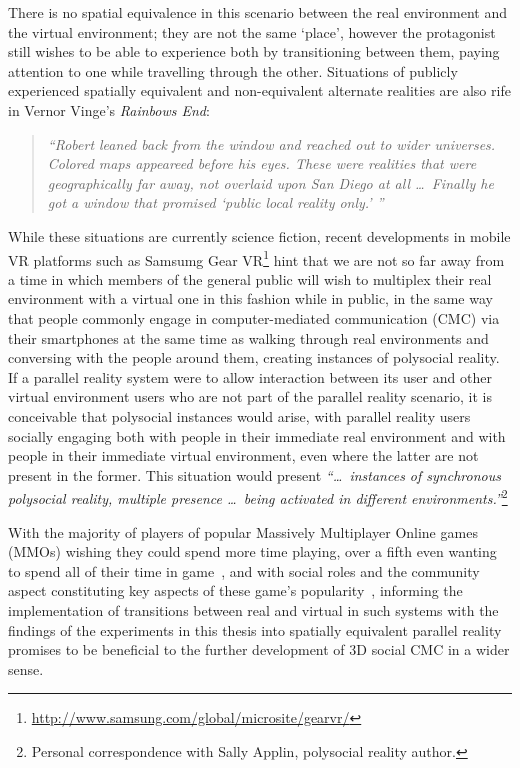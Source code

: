 There is no spatial equivalence in this scenario between the real environment and the virtual environment; they are not the same `place', however the protagonist still wishes to be able to experience both by transitioning between them, paying attention to one while travelling through the other. Situations of publicly experienced spatially equivalent and non-equivalent alternate realities are also rife in Vernor Vinge's \textit{Rainbows End}:

\begin{quote}
	\textit{``Robert leaned back from the window and reached out to wider universes. Colored maps appeareed before his eyes. These were realities that were geographically far away, not overlaid upon San Diego at all \ldots\ Finally he got a window that promised `public local reality only.' ''}~\cite{Vinge2006}
\end{quote}

While these situations are currently science fiction, recent developments in mobile VR platforms such as Samsumg Gear VR\footnote{\url{http://www.samsung.com/global/microsite/gearvr/}} hint that we are not so far away from a time in which members of the general public will wish to multiplex their real environment with a virtual one in this fashion while in public, in the same way that people commonly engage in computer-mediated communication (CMC) via their smartphones at the same time as walking through real environments and conversing with the people around them, creating instances of polysocial reality. If a parallel reality system were to allow interaction between its user and other virtual environment users who are not part of the parallel reality scenario, it is conceivable that polysocial instances would arise, with parallel reality users socially engaging both with people in their immediate real environment and with people in their immediate virtual environment, even where the latter are not present in the former. This situation would present \textit{``\ldots\ instances of synchronous polysocial reality, multiple presence \ldots\ being activated in different environments.''}\footnote{Personal correspondence with Sally Applin, polysocial reality author.}

With the majority of players of popular Massively Multiplayer Online games (MMOs) wishing they could spend more time playing, over a fifth even wanting to spend all of their time in game~\cite{Castronova2006}, and with social roles and the community aspect constituting key aspects of these game's popularity~\cite{Castronova2006, Bartle2004}, informing the implementation of transitions between real and virtual in such systems with the findings of the experiments in this thesis into spatially equivalent parallel reality promises to be beneficial to the further development of 3D social CMC in a wider sense.

